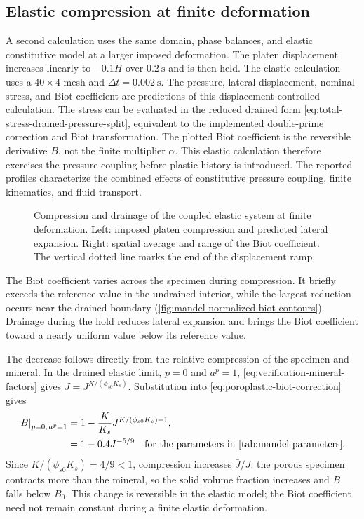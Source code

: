 \FloatBarrier

\subsection{Elastic compression at finite deformation}
\label{sec:mandel-finite-deformation-continuation}

A second calculation uses the same domain, phase balances, and elastic
constitutive model at a larger imposed deformation.  The platen displacement
increases linearly to \(-0.1H\) over \(0.2\ \mathrm{s}\) and is then held. The elastic calculation uses a \(40\times4\) mesh
and \(\Delta t=0.002\ \mathrm{s}\).
The pressure, lateral displacement, nominal stress, and Biot coefficient are
predictions of this displacement-controlled calculation.
The stress can be evaluated in the reduced drained form
\eqref{eq:total-stress-drained-pressure-split}, equivalent to the implemented
double-prime correction and Biot transformation.  The plotted Biot coefficient
is the reversible derivative \(B\), not the finite multiplier \(\alpha\).
This elastic calculation therefore exercises the pressure coupling before
plastic history is introduced.  The reported profiles characterize the
combined effects of constitutive pressure coupling, finite kinematics, and
fluid transport.

\begin{figure}[ht]
 \centering
 \caption{Compression and drainage of the coupled elastic system at finite deformation.
 Left: imposed platen compression and predicted lateral expansion.
 Right: spatial average and range of the Biot coefficient.  The vertical
 dotted line marks the end of the displacement ramp.}
 \label{fig:mandel-finite-deformation}
\end{figure}

The Biot coefficient varies across the specimen during compression.  It briefly
exceeds the reference value in the undrained interior, while the largest
reduction occurs near the drained boundary
(\cref{fig:mandel-normalized-biot-contours}).  Drainage during the hold
reduces lateral expansion and brings the Biot coefficient toward a nearly
uniform value below its reference value.

The decrease follows directly from the relative compression of the specimen
and mineral. In the drained elastic limit, \(p=0\) and \(a^p=1\),
\eqref{eq:verification-mineral-factors} gives
\(\bar J=J^{K/(\phi_{s0}K_s)}\). Substitution into
\eqref{eq:poroplastic-biot-correction} gives
\begin{align*}
 \left.B\right|_{p=0,\,a^p=1}
 &=1-\frac{K}{K_s}J^{K/(\phi_{s0}K_s)-1},
\\
 &=1-0.4J^{-5/9}
 \quad\text{for the parameters in \cref{tab:mandel-parameters}}.
\end{align*}
Since \(K/(\phi_{s0}K_s)=4/9<1\), compression increases
\(\bar J/J\): the porous specimen contracts more than the mineral, so the
solid volume fraction increases and \(B\) falls below \(B_0\).
This change is reversible in the elastic model; the Biot coefficient need not
remain constant during a finite elastic deformation.

